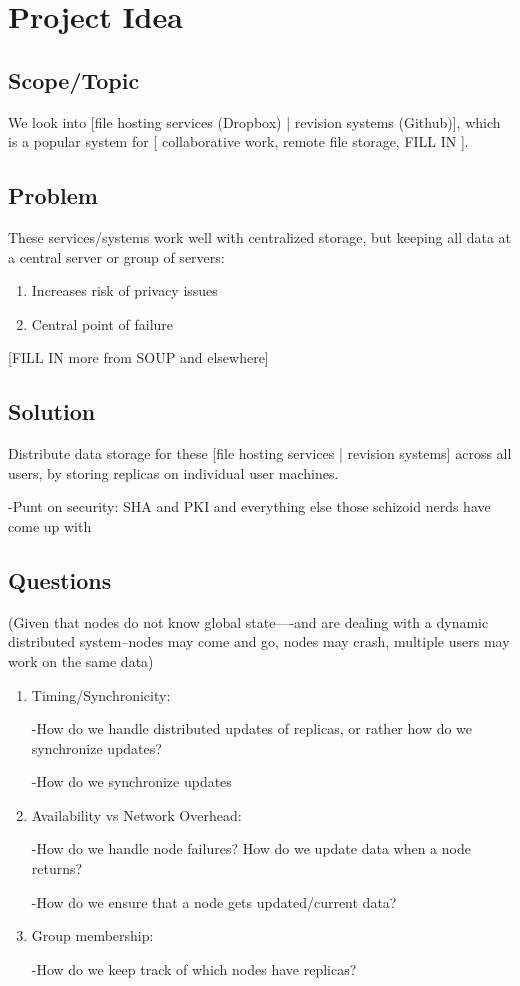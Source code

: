 \section{Project Idea}
\subsection{Scope/Topic} 
We look into [file hosting services (Dropbox) | revision systems (Github)], which is a popular system for [ collaborative work, remote file storage, FILL IN ].
\subsection{Problem} 
These services/systems work well with centralized storage, but keeping all data at a central server or group of servers:
\begin{enumerate}
\item Increases risk of privacy issues
\item Central point of failure
\end{enumerate}
[FILL IN more from SOUP and elsewhere]
\subsection{Solution}
Distribute data storage for these [file hosting services | revision systems] across all users, by storing replicas on individual user machines.

-Punt on security: SHA and PKI and everything else those schizoid nerds have come up with
\subsection{Questions}
(Given that nodes do not know global state----and are dealing with a dynamic distributed system--nodes may come and go, nodes may crash, multiple users may work on the same data)
\begin{enumerate}
\item Timing/Synchronicity:

-How do we handle distributed updates of replicas, or rather how do we synchronize updates?

-How do we synchronize updates

\item Availability vs Network Overhead:

-How do we handle node failures?  How do we update data when a node returns?

-How do we ensure that a node gets updated/current data?

\item Group membership:

-How do we keep track of which nodes have replicas?
\end{enumerate}

